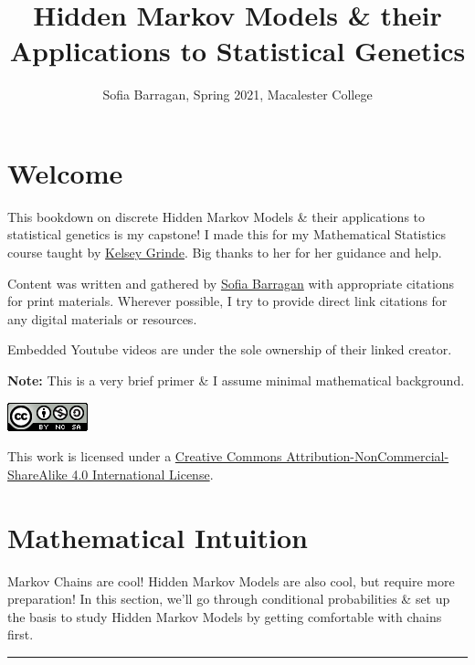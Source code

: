 \documentclass[
]{book}
\title{Hidden Markov Models \& their Applications to Statistical Genetics}
\author{Sofia Barragan, Spring 2021, Macalester College}
\date{}
\begin{document}
\maketitle

{
\setcounter{tocdepth}{1}
\tableofcontents
}
\hypertarget{welcome}{%
\chapter*{Welcome}\label{welcome}}

This bookdown on discrete Hidden Markov Models \& their applications to statistical genetics is my capstone! I made this for my Mathematical Statistics course taught by \href{http://kegrinde.github.io}{Kelsey Grinde}. Big thanks to her for her guidance and help.

Content was written and gathered by \href{https://www.sofiabarragan.com}{Sofia Barragan} with appropriate citations for print materials. Wherever possible, I try to provide direct link citations for any digital materials or resources.

Embedded Youtube videos are under the sole ownership of their linked creator.

\textbf{Note:} This is a very brief primer \& I assume minimal mathematical background.

\includegraphics{images/cc_license_button.png}

This work is licensed under a \href{https://creativecommons.org/licenses/by-nc-sa/4.0/}{Creative Commons Attribution-NonCommercial-ShareAlike 4.0 International License}.

\hypertarget{mathematical-intuition}{%
\chapter{Mathematical Intuition}\label{mathematical-intuition}}

Markov Chains are cool! Hidden Markov Models are also cool, but require more preparation! In this section, we'll go through conditional probabilities \& set up the basis to study Hidden Markov Models by getting comfortable with chains first.

\hfill\break

\begin{center}\rule{0.5\linewidth}{0.5pt}\end{center}
\end{document}
